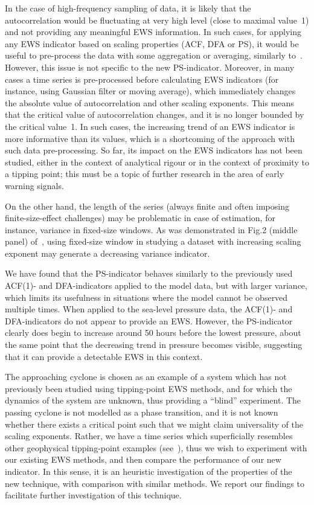 \documentclass[doublecol]{epl2}
\begin{document}
In the case of high-frequency sampling
of data, it is likely that the autocorrelation would be fluctuating 
at very high level (close to maximal value~1) and not providing any 
meaningful EWS information. In such cases, for applying any EWS indicator
based on scaling properties (ACF, DFA or PS), it would be useful to 
pre-process the data with 
some aggregation or averaging, similarly to~\cite{held2004}. 
However, this issue is not specific to the 
new PS-indicator. Moreover, in many cases a time series is pre-processed 
before calculating EWS indicators (for instance, using Gaussian filter
or moving average), which immediately changes the absolute value of
autocorrelation and other scaling exponents. This means that the critical 
value of autocorrelation changes, and it is no longer bounded 
by the critical
value~1. In such cases, the increasing trend of an EWS indicator is more
informative than its values, which is a shortcoming of the approach with 
such data pre-processing. So far, its impact on the EWS 
indicators has not been studied, either in the context of analytical 
rigour or in the context of proximity to a tipping point; 
this must be a topic of further research in the area of 
early warning signals.

On the other hand, the length of the series (always
finite and often imposing finite-size-effect challenges) may be problematic
in case of estimation, for instance, variance in fixed-size windows. 
As was demonstrated in Fig.2 (middle panel) 
of~\cite{livina2012}, using
fixed-size window in studying a dataset with increasing scaling exponent 
may generate a decreasing variance indicator. 


We have found that the PS-indicator behaves similarly to the 
previously used ACF(1)- and DFA-indicators applied to the model 
data, but with larger variance, which limits its usefulness in 
situations where the model cannot be observed multiple times. 
When applied to the sea-level pressure data, the ACF(1)- and 
DFA-indicators do not appear to provide an EWS. However, the 
PS-indicator clearly does begin to increase around 50 hours 
before the lowest pressure, about the same point that the 
decreasing trend in pressure becomes visible, suggesting that 
it can provide a detectable EWS in this context. 

The approaching cyclone is chosen as an example 
of a system which 
has not previously been studied using tipping-point 
EWS methods, and for which the dynamics of the system are unknown, 
thus providing a ``blind'' experiment. The passing cyclone is not 
modelled as a phase transition, and it is not known whether 
there exists a critical point such that we might claim universality 
of the scaling exponents. Rather, we have a time series which 
superficially resembles other geophysical tipping-point examples 
(see~\cite{dakos2008}), thus we wish to 
experiment with our existing EWS methods, and then compare the 
performance of our new indicator. 
In this sense, it is an heuristic 
investigation of the properties of the new technique, with 
comparison with similar methods. We report our findings to facilitate
further investigation of this technique.
\end{document}
